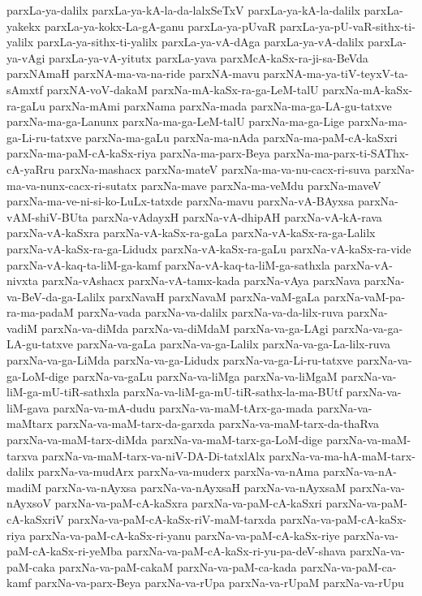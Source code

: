 {parxLa-ya-dalilx
parxLa-ya-kA-la-da-lalxSeTxV
parxLa-ya-kA-la-dalilx
parxLa-yakekx
parxLa-ya-kokx-La-gA-ganu
parxLa-ya-pUvaR
parxLa-ya-pU-vaR-sithx-ti-yalilx
parxLa-ya-sithx-ti-yalilx
parxLa-ya-vA-dAga
parxLa-ya-vA-dalilx
parxLa-ya-vAgi
parxLa-ya-vA-yitutx
parxLa-yava
parxMcA-kaSx-ra-ji-sa-BeVda
parxNAmaH
parxNA-ma-va-na-ride
parxNA-mavu
parxNA-ma-ya-tiV-teyxV-ta-sAmxtf
parxNA-voV-dakaM
parxNa-mA-kaSx-ra-ga-LeM-talU
parxNa-mA-kaSx-ra-gaLu
parxNa-mAmi
parxNama
parxNa-mada
parxNa-ma-ga-LA-gu-tatxve
parxNa-ma-ga-Lanunx
parxNa-ma-ga-LeM-talU
parxNa-ma-ga-Lige
parxNa-ma-ga-Li-ru-tatxve
parxNa-ma-gaLu
parxNa-ma-nAda
parxNa-ma-paM-cA-kaSxri
parxNa-ma-paM-cA-kaSx-riya
parxNa-ma-parx-Beya
parxNa-ma-parx-ti-SAThx-cA-yaRru
parxNa-mashacx
parxNa-mateV
parxNa-ma-va-nu-cacx-ri-suva
parxNa-ma-va-nunx-cacx-ri-sutatx
parxNa-mave
parxNa-ma-veMdu
parxNa-maveV
parxNa-ma-ve-ni-si-ko-LuLx-tatxde
parxNa-mavu
parxNa-vA-BAyxsa
parxNa-vAM-shiV-BUta
parxNa-vAdayxH
parxNa-vA-dhipAH
parxNa-vA-kA-rava
parxNa-vA-kaSxra
parxNa-vA-kaSx-ra-gaLa
parxNa-vA-kaSx-ra-ga-Lalilx
parxNa-vA-kaSx-ra-ga-Lidudx
parxNa-vA-kaSx-ra-gaLu
parxNa-vA-kaSx-ra-vide
parxNa-vA-kaq-ta-liM-ga-kamf
parxNa-vA-kaq-ta-liM-ga-sathxla
parxNa-vA-nivxta
parxNa-vAshacx
parxNa-vA-tamx-kada
parxNa-vAya
parxNava
parxNa-va-BeV-da-ga-Lalilx
parxNavaH
parxNavaM
parxNa-vaM-gaLa
parxNa-vaM-pa-ra-ma-padaM
parxNa-vada
parxNa-va-dalilx
parxNa-va-da-lilx-ruva
parxNa-vadiM
parxNa-va-diMda
parxNa-va-diMdaM
parxNa-va-ga-LAgi
parxNa-va-ga-LA-gu-tatxve
parxNa-va-gaLa
parxNa-va-ga-Lalilx
parxNa-va-ga-La-lilx-ruva
parxNa-va-ga-LiMda
parxNa-va-ga-Lidudx
parxNa-va-ga-Li-ru-tatxve
parxNa-va-ga-LoM-dige
parxNa-va-gaLu
parxNa-va-liMga
parxNa-va-liMgaM
parxNa-va-liM-ga-mU-tiR-sathxla
parxNa-va-liM-ga-mU-tiR-sathx-la-ma-BUtf
parxNa-va-liM-gava
parxNa-va-mA-dudu
parxNa-va-maM-tArx-ga-mada
parxNa-va-maMtarx
parxNa-va-maM-tarx-da-garxda
parxNa-va-maM-tarx-da-thaRva
parxNa-va-maM-tarx-diMda
parxNa-va-maM-tarx-ga-LoM-dige
parxNa-va-maM-tarxva
parxNa-va-maM-tarx-va-niV-DA-Di-tatxlAlx
parxNa-va-ma-hA-maM-tarx-dalilx
parxNa-va-mudArx
parxNa-va-muderx
parxNa-va-nAma
parxNa-va-nA-madiM
parxNa-va-nAyxsa
parxNa-va-nAyxsaH
parxNa-va-nAyxsaM
parxNa-va-nAyxsoV
parxNa-va-paM-cA-kaSxra
parxNa-va-paM-cA-kaSxri
parxNa-va-paM-cA-kaSxriV
parxNa-va-paM-cA-kaSx-riV-maM-tarxda
parxNa-va-paM-cA-kaSx-riya
parxNa-va-paM-cA-kaSx-ri-yanu
parxNa-va-paM-cA-kaSx-riye
parxNa-va-paM-cA-kaSx-ri-yeMba
parxNa-va-paM-cA-kaSx-ri-yu-pa-deV-shava
parxNa-va-paM-caka
parxNa-va-paM-cakaM
parxNa-va-paM-ca-kada
parxNa-va-paM-ca-kamf
parxNa-va-parx-Beya
parxNa-va-rUpa
parxNa-va-rUpaM
parxNa-va-rUpu
}
